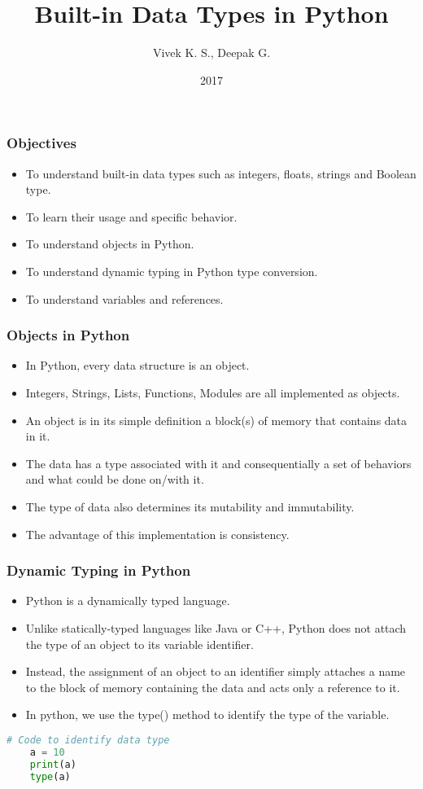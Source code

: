 \documentclass{beamer}
\title{Built-in Data Types in Python}
\author{Vivek K. S., Deepak G.}
\institute{Information Systems Decision Sciences (ISDS)\\
MUMA College of Business\\
University of South Florida \\
Tampa, Florida}
\date{2017}
\begin{document}
 
\frame{\titlepage}
 
\begin{frame}
\frametitle{Objectives}

\begin{itemize}
\item To understand built-in data types such as integers, floats, strings and Boolean type.
\item To learn their usage and specific behavior.
\item To understand objects in Python.
\item To understand dynamic typing in Python type conversion.
\item To understand variables and references.
\end{itemize}
\end{frame}

\begin{frame}
\frametitle{Objects in Python}
\begin{itemize}
\item In Python, every data structure is an object. 
\item Integers, Strings, Lists, Functions, Modules are all implemented as objects. 
\item An object is in its simple definition a  block(s) of memory that contains data in it.
\item The data has a type associated with it and consequentially a set of behaviors and what could be done on/with it.
\item The type of data also determines its mutability and immutability.
\item The advantage of this implementation is consistency.
\end{itemize}
\end{frame}

\begin{frame}[fragile]
\frametitle{Dynamic Typing in Python}
\begin{itemize}
\item Python is a dynamically typed language.
\item Unlike statically-typed languages like Java or C++, Python does not attach the type of an object to its variable identifier.
\item Instead, the assignment of an object to an identifier simply attaches a name to the block of memory containing the data and acts only a reference to it. 
\item In python, we use the type() method to identify the type of the variable.
\end{itemize}
\begin{lstlisting}[language=Python, keywordstyle=\color{blue}]
	# Code to identify data type
	a = 10
	print(a)
	type(a)


\end{lstlisting}
\end{frame}
\end{document}
